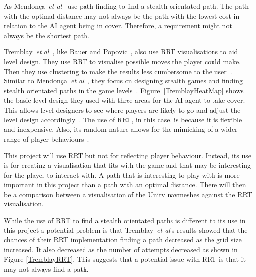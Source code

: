 \documentclass[journal]{IEEEtran}
\begin{document}
As Mendonça~\textit{et al}~\cite{Mendonça2015} use path-finding to find a stealth orientated path. The path with the optimal distance may not always be the path with the lowest cost in relation to the AI agent being in cover. Therefore, a requirement might not always be the shortest path. 

Tremblay~\textit{et al}~\cite{Tremblay2013}, like Bauer and Popovic~\cite{bauer2012}, also use RRT visualisations to aid level design. They use RRT to visualise possible moves the player could make. Then they use clustering to make the results less cumbersome to the user~\cite{Tremblay2013}. Similar to Mendonça~\textit{et al}~\cite{Mendonça2015}, they focus on designing stealth games and finding stealth orientated paths in the game levels~\cite{Tremblay2013}.   Figure~\ref{TremblayHeatMap} shows the basic level design they used with three areas for the AI agent to take cover. This allows level designers to see where players are likely to go and adjust the level design accordingly~\cite{Tremblay2013}.  The use of RRT, in this case, is because it is flexible and inexpensive. Also, its random nature allows for the mimicking of a wider range of player behaviours~\cite{Tremblay2013}. 

This project will use RRT but not for reflecting player behaviour.  Instead, its use is for creating a visualisation that fits with the game and that may be interesting for the player to interact with. A path that is interesting to play with is more important in this project than a path with an optimal distance. There will then be a comparison between a visualisation of the Unity navmeshes against the RRT visualisation.

While the use of RRT to find a stealth orientated paths is different to its use in this project a potential problem is that Tremblay~\textit{et al}'s results showed that the chances of their RRT implementation finding a path decreased as the grid size increased. It also decreased as the number of attempts decreased as shown in Figure \ref{TremblayRRT}.  This suggests that a potential issue with RRT is that it may not always find a path.
\end{document}
